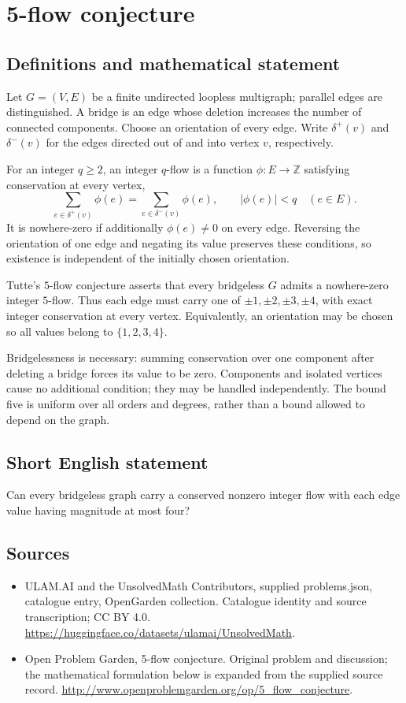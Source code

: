 \documentclass[11pt,a4paper]{article}
\begin{document}
\section*{5-flow conjecture}\label{statement}

\subsection{Definitions and mathematical statement}
Let $G=(V,E)$ be a finite undirected
loopless multigraph; parallel edges
are distinguished. A bridge is an
edge whose deletion increases the
number of connected components.
Choose an orientation of every edge.
Write $\delta^+(v)$ and $\delta^-(v)$
for the edges directed out of and
into vertex $v$, respectively.

For an integer $q\geq2$, an integer
$q$-flow is a function $\phi:E\to\mathbb Z$
satisfying conservation at every vertex,
\[
 \sum_{e\in\delta^+(v)}\phi(e)
 =\sum_{e\in\delta^-(v)}\phi(e),
 \qquad |\phi(e)|<q\quad(e\in E).
\]
It is nowhere-zero if additionally
$\phi(e)\neq0$ on every edge.
Reversing the orientation of one
edge and negating its value preserves
these conditions, so existence is
independent of the initially chosen
orientation.

Tutte's $5$-flow conjecture asserts
that every bridgeless $G$ admits a
nowhere-zero integer $5$-flow. Thus
each edge must carry one of
$\pm1,\pm2,\pm3,\pm4$, with exact
integer conservation at every vertex.
Equivalently, an orientation may be
chosen so all values belong to
$\{1,2,3,4\}$.

Bridgelessness is necessary: summing
conservation over one component after
deleting a bridge forces its value
to be zero. Components and isolated
vertices cause no additional condition;
they may be handled independently.
The bound five is uniform over all
orders and degrees, rather than a
bound allowed to depend on the graph.
\subsection{Short English statement}
Can every bridgeless graph carry a conserved nonzero integer flow with each edge value having magnitude at most four?
\subsection{Sources}
\begin{itemize}
\item[S1] ULAM.AI and the UnsolvedMath Contributors, supplied problems.json, catalogue entry, OpenGarden collection. Catalogue identity and source transcription; CC BY 4.0.
\url{https://huggingface.co/datasets/ulamai/UnsolvedMath}.
\item[S2] Open Problem Garden, 5-flow conjecture. Original problem and discussion; the mathematical formulation below is expanded from the supplied source record.
\url{http://www.openproblemgarden.org/op/5_flow_conjecture}.
\end{itemize}
\end{document}
